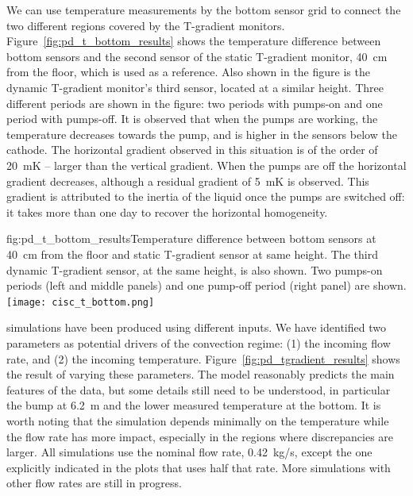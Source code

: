 We can use temperature measurements by the bottom sensor grid to connect the two different 
regions covered by the T-gradient monitors. Figure~\ref{fig:pd_t_bottom_results} shows the temperature difference between bottom sensors and the second sensor of the static T-gradient monitor, \SI{40}{cm} from the floor, which is used as a reference. %
Also shown in the figure is the  dynamic T-gradient monitor's third sensor, located at a similar height. Three different periods are shown in the figure: two periods with pumps-on and one period with pumps-off. It is observed that when the pumps are working, the temperature decreases towards the  pump, and is %
higher in the sensors below the cathode. The horizontal gradient observed in this situation is of the order of \SI{20}{mK} -- larger than the vertical gradient. When the pumps are off the horizontal gradient decreases, although a residual gradient of  \SI{5}{mK}  is observed. This gradient is attributed to the inertia of the liquid once the pumps are switched off: it takes more than one day to recover the horizontal homogeneity.    

\begin{dunefigure}{fig:pd_t_bottom_results}{Temperature difference between bottom sensors at  \SI{40}{cm} from the floor and static T-gradient sensor at same height. The third dynamic T-gradient sensor, at the same height, is also shown. Two pumps-on periods (left and middle panels) and one pump-off period (right panel) are shown.}
  \texttt{[image: cisc\_t\_bottom.png]}%
\end{dunefigure}

 simulations have been produced using different inputs. We have identified two  parameters %
as potential drivers of the convection regime: (1) the incoming  flow rate, and (2) the incoming  temperature. Figure~\ref{fig:pd_tgradient_results} shows the result of varying these parameters. 
The  model reasonably predicts the main features of the data, but some details still need to be understood, in particular the bump at \SI{6.2}{m} and the lower measured temperature at the bottom. It is worth noting that the simulation depends minimally on the  temperature while the flow rate has more impact, especially in the regions where discrepancies are larger. All simulations use the nominal  flow rate, \SI{0.42}{kg/s}, except the one explicitly indicated 
in the plots that uses half that rate. More simulations with other  flow rates %
are still in progress.

